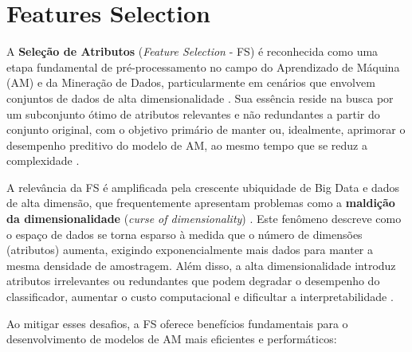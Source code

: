 \section{Features Selection}\label{sec:fs} 

A \textbf{Seleção de Atributos} (\textit{Feature Selection} - FS) é reconhecida como uma etapa fundamental de pré-processamento no campo do Aprendizado de Máquina (AM) e da Mineração de Dados, particularmente em cenários que envolvem conjuntos de dados de alta dimensionalidade \cite{Dhal2022} \cite{BARBIERI2024123667} \cite{10.1007/978-3-031-23092-9_12}. Sua essência reside na busca por um subconjunto ótimo de atributos relevantes e não redundantes a partir do conjunto original, com o objetivo primário de manter ou, idealmente, aprimorar o desempenho preditivo do modelo de AM, ao mesmo tempo que se reduz a complexidade \cite{Theng2024} \cite{Emmoh2024}.

A relevância da FS é amplificada pela crescente ubiquidade de Big Data e dados de alta dimensão, que frequentemente apresentam problemas como a \textbf{maldição da dimensionalidade} (\textit{curse of dimensionality}) \cite{Dhal2022} \cite{BARBIERI2024123667} \cite{10.1007/978-3-031-23092-9_12}. Este fenômeno descreve como o espaço de dados se torna esparso à medida que o número de dimensões (atributos) aumenta, exigindo exponencialmente mais dados para manter a mesma densidade de amostragem. Além disso, a alta dimensionalidade introduz atributos irrelevantes ou redundantes que podem degradar o desempenho do classificador, aumentar o custo computacional e dificultar a interpretabilidade \cite{EBRAHIMIWARKIANI2025129372} \cite{Bouchlaghem2022}.

Ao mitigar esses desafios, a FS oferece benefícios fundamentais para o desenvolvimento de modelos de AM mais eficientes e performáticos:

